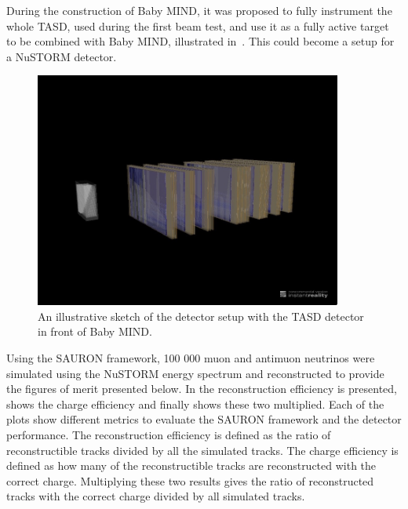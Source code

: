 During the construction of Baby MIND, it was proposed to fully instrument the whole TASD, used during the first beam test, and use it as a fully active target to be combined with Baby MIND, illustrated in~. This could become a setup for a NuSTORM detector.

\begin{figure}[h!]
\centering
\includegraphics[width=0.9\textwidth]{figures/MINDAida.jpeg}
\caption{An illustrative sketch of the detector setup with the TASD detector in front of Baby MIND.}
\label{fig:TASDandMIND}
\end{figure}

Using the SAURON framework, 100 000 muon and antimuon neutrinos were simulated using the NuSTORM energy spectrum and reconstructed to provide the figures of merit presented below. In  the reconstruction efficiency is presented,  shows the charge efficiency and finally  shows these two multiplied. Each of the plots show different metrics to evaluate the SAURON framework and the detector performance. The reconstruction efficiency is defined as the ratio of reconstructible tracks divided by all the simulated tracks. The charge efficiency is defined as how many of the reconstructible tracks are reconstructed with the correct charge. Multiplying these two results gives the ratio of reconstructed tracks with the correct charge divided by all simulated tracks.

